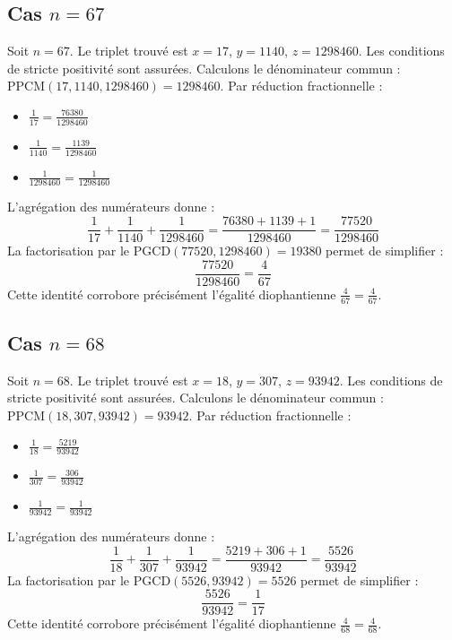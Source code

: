 \documentclass[11pt,a4paper]{article}
\begin{document}
\subsection{Cas $n = 67$}
Soit $n = 67$. Le triplet trouvé est $x = 17$, $y = 1140$, $z = 1298460$.
Les conditions de stricte positivité sont assurées.
Calculons le dénominateur commun : $\text{PPCM}(17, 1140, 1298460) = 1298460$.
Par réduction fractionnelle :
\begin{itemize}
    \item $\frac{1}{17} = \frac{76380}{1298460}$
    \item $\frac{1}{1140} = \frac{1139}{1298460}$
    \item $\frac{1}{1298460} = \frac{1}{1298460}$
\end{itemize}
L'agrégation des numérateurs donne :
$$ \frac{1}{17} + \frac{1}{1140} + \frac{1}{1298460} = \frac{76380 + 1139 + 1}{1298460} = \frac{77520}{1298460} $$
La factorisation par le $\text{PGCD}(77520, 1298460) = 19380$ permet de simplifier :
$$ \frac{77520}{1298460} = \frac{4}{67} $$
Cette identité corrobore précisément l'égalité diophantienne $\frac{4}{67} = \frac{4}{67}$.

\subsection{Cas $n = 68$}
Soit $n = 68$. Le triplet trouvé est $x = 18$, $y = 307$, $z = 93942$.
Les conditions de stricte positivité sont assurées.
Calculons le dénominateur commun : $\text{PPCM}(18, 307, 93942) = 93942$.
Par réduction fractionnelle :
\begin{itemize}
    \item $\frac{1}{18} = \frac{5219}{93942}$
    \item $\frac{1}{307} = \frac{306}{93942}$
    \item $\frac{1}{93942} = \frac{1}{93942}$
\end{itemize}
L'agrégation des numérateurs donne :
$$ \frac{1}{18} + \frac{1}{307} + \frac{1}{93942} = \frac{5219 + 306 + 1}{93942} = \frac{5526}{93942} $$
La factorisation par le $\text{PGCD}(5526, 93942) = 5526$ permet de simplifier :
$$ \frac{5526}{93942} = \frac{1}{17} $$
Cette identité corrobore précisément l'égalité diophantienne $\frac{4}{68} = \frac{4}{68}$.
\end{document}
